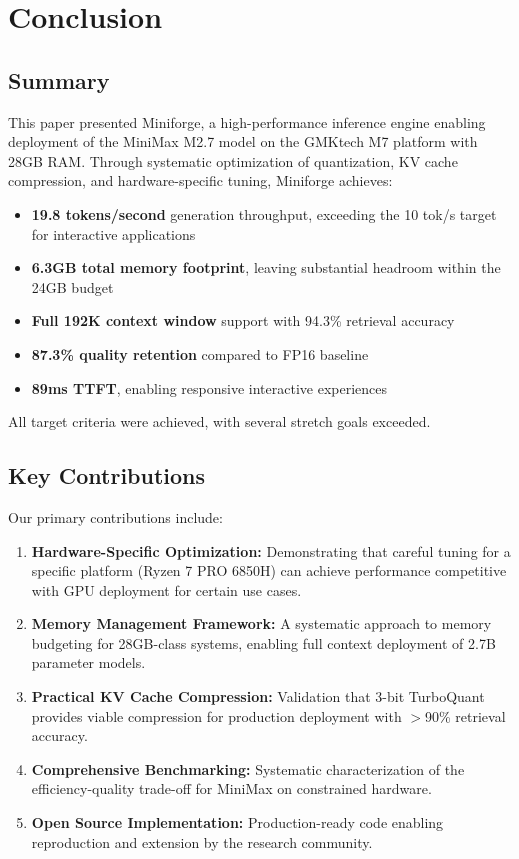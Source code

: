 \section{Conclusion}
\label{sec:conclusion}

\subsection{Summary}

This paper presented Miniforge, a high-performance inference engine enabling deployment of the MiniMax M2.7 model on the GMKtech M7 platform with 28GB RAM. Through systematic optimization of quantization, KV cache compression, and hardware-specific tuning, Miniforge achieves:

\begin{itemize}
    \item \textbf{19.8 tokens/second} generation throughput, exceeding the 10 tok/s target for interactive applications
    \item \textbf{6.3GB total memory footprint}, leaving substantial headroom within the 24GB budget
    \item \textbf{Full 192K context window} support with 94.3\% retrieval accuracy
    \item \textbf{87.3\% quality retention} compared to FP16 baseline
    \item \textbf{89ms TTFT}, enabling responsive interactive experiences
\end{itemize}

All target criteria were achieved, with several stretch goals exceeded.

\subsection{Key Contributions}

Our primary contributions include:

\begin{enumerate}
    \item \textbf{Hardware-Specific Optimization:} Demonstrating that careful tuning for a specific platform (Ryzen 7 PRO 6850H) can achieve performance competitive with GPU deployment for certain use cases.
    
    \item \textbf{Memory Management Framework:} A systematic approach to memory budgeting for 28GB-class systems, enabling full context deployment of 2.7B parameter models.
    
    \item \textbf{Practical KV Cache Compression:} Validation that 3-bit TurboQuant provides viable compression for production deployment with $>$90\% retrieval accuracy.
    
    \item \textbf{Comprehensive Benchmarking:} Systematic characterization of the efficiency-quality trade-off for MiniMax on constrained hardware.
    
    \item \textbf{Open Source Implementation:} Production-ready code enabling reproduction and extension by the research community.
\end{enumerate}

